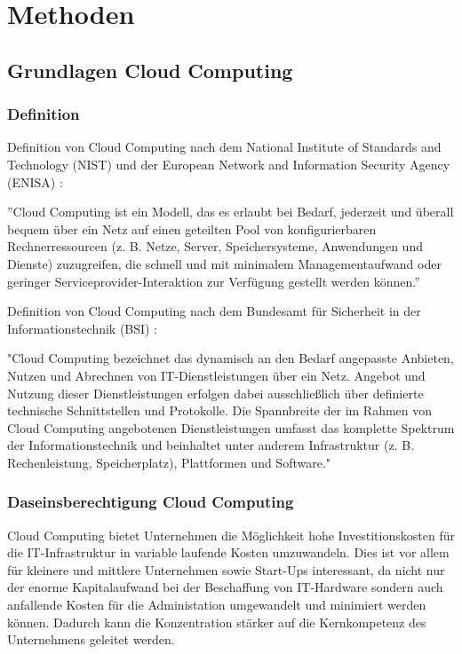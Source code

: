 \documentclass[12pt,a4paper,bibliography=totocnumbered,listof=totocnumbered]{scrartcl}
\begin{document}
\section{Methoden}
\subsection{Grundlagen Cloud Computing}
\subsubsection{Definition}
Definition von Cloud Computing nach dem National Institute of Standards and Technology (NIST) und der European Network and Information Security Agency (ENISA) \cite{34}:

''Cloud Computing ist ein Modell, das es erlaubt bei Bedarf, jederzeit und überall bequem über ein Netz auf einen geteilten Pool von konfigurierbaren Rechnerressourcen (z. B. Netze, Server, Speichersysteme, Anwendungen und Dienste) zuzugreifen, die schnell und mit minimalem Managementaufwand oder geringer Serviceprovider-Interaktion zur Verfügung gestellt werden können.''

Definition von Cloud Computing nach dem Bundesamt für Sicherheit in der Informationstechnik (BSI) \cite{35}:

"Cloud Computing bezeichnet das dynamisch an den Bedarf angepasste Anbieten, Nutzen und Abrechnen von IT-Dienstleistungen über ein Netz. Angebot und Nutzung dieser Dienstleistungen erfolgen dabei ausschließlich über definierte technische Schnittstellen und Protokolle. Die Spannbreite der im Rahmen von Cloud Computing angebotenen Dienstleistungen umfasst das komplette Spektrum der Informationstechnik und beinhaltet unter anderem Infrastruktur (z. B. Rechenleistung, Speicherplatz), Plattformen und Software."

\subsubsection{Daseinsberechtigung Cloud Computing}
Cloud Computing bietet Unternehmen die Möglichkeit hohe Investitionskosten für die IT-Infrastruktur in variable laufende Kosten umzuwandeln. Dies ist vor allem für kleinere und mittlere Unternehmen sowie Start-Ups interessant, da nicht nur der enorme Kapitalaufwand bei der Beschaffung von IT-Hardware sondern auch anfallende Kosten für die Administation umgewandelt und minimiert werden können. Dadurch kann die Konzentration stärker auf die Kernkompetenz des Unternehmens geleitet werden.
\cite{33} \cite{39}
\end{document}
